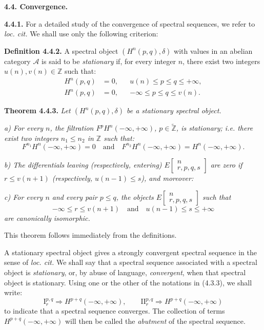\clearpage
{}%
\begingroup\small\setlength{\parskip}{0pt}\setlength{\emergencystretch}{1.5em}
\medskip\noindent\textbf{4.4. Convergence.}

\medskip\noindent\textbf{4.4.1.}\quad
For a detailed study of the convergence of spectral sequences, we refer to
\emph{loc. cit.} We shall use only the following criterion:

\medskip\noindent\textbf{Definition 4.4.2.}\quad
A spectral object $(H^n(p,q),\delta)$ with values in an abelian category
$\mathcal A$ is said to be \emph{stationary} if, for every integer $n$,
there exist two integers $u(n),v(n)\in\mathbb Z$ such that:
\[
\begin{aligned}
H^n(p,q)&=0,&&u(n)\leq p\leq q\leq+\infty,\\
H^n(p,q)&=0,&&-\infty\leq p\leq q\leq v(n).
\end{aligned}
\]

\medskip\noindent\textbf{Theorem 4.4.3.}\quad
\textit{Let $(H^n(p,q),\delta)$ be a stationary spectral object.}

\textit{a) For every $n$, the filtration
$F^pH^n(-\infty,+\infty)$, $p\in\widetilde{\mathbb Z}$, is stationary;
i.e. there exist two integers $n_1\leq n_2$ in $\mathbb Z$ such that:}
\[
F^{n_1}H^n(-\infty,+\infty)=0
\quad\text{and}\quad
F^{n_2}H^n(-\infty,+\infty)=H^n(-\infty,+\infty).
\]

\textit{b) The differentials leaving (respectively, entering)
$E\!\left[\begin{smallmatrix}n\\r,p,q,s\end{smallmatrix}\right]$ are zero
if $r\leq v(n+1)$ (respectively, $u(n-1)\leq s$), and moreover:}

\textit{c) For every $n$ and every pair $p\leq q$, the objects
$E\!\left[\begin{smallmatrix}n\\r,p,q,s\end{smallmatrix}\right]$ such that}
\[
-\infty\leq r\leq v(n+1)
\quad\text{and}\quad
u(n-1)\leq s\leq+\infty
\]
\textit{are canonically isomorphic.}

This theorem follows immediately from the definitions.

A stationary spectral object gives a strongly convergent spectral sequence
in the sense of \emph{loc. cit.} We shall say that a spectral sequence
associated with a spectral object is \emph{stationary}, or, by abuse of
language, \emph{convergent}, when that spectral object is stationary. Using
one or the other of the notations in (4.3.3), we shall write:
\[
\mathrm I_r^{p,q}\Longrightarrow H^{p+q}(-\infty,+\infty),
\qquad
\mathrm{II}_r^{p,q}\Longrightarrow H^{p+q}(-\infty,+\infty)
\]
to indicate that a spectral sequence converges. The collection of terms
$H^{p+q}(-\infty,+\infty)$ will then be called the \emph{abutment} of the
spectral sequence.
\endgroup
